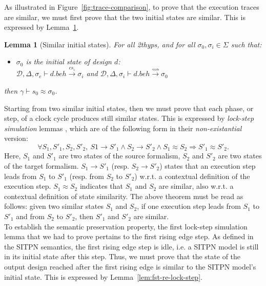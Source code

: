 \documentclass[pdflatex,sn-mathphys]{sn-jnl}%
\theoremstyle{thmstyleone}%
\theoremstyle{thmstyletwo}%
\theoremstyle{thmstylethree}%
\newtheorem{lemma}{Lemma}%
\begin{document}
As illustrated in Figure~\ref{fig:trace-comparison}, to prove that the
execution traces are similar, we must first prove that the two initial
states are similar. This is expressed by
Lemma~\ref{lem:sim-init-states}.
\begin{lemma}[Similar initial states]
  \label{lem:sim-init-states}
  For all \hm2thyps{}, and for all $\sigma_0,\sigma_i\in{}\Sigma$ such that:
  \begin{itemize}
  \item $\sigma_0$ is the initial state of design $d$:\\
    $\mathcal{D},\Delta,\sigma_e\vdash{}d.beh\xrightarrow{cs_i}{}\sigma_i$ and
    $\mathcal{D},\Delta,\sigma_i\vdash{}d.beh\xrightarrow{\rightsquigarrow}{}\sigma_0$
  \end{itemize}
  then $\gamma\vdash{}s_0\approx\sigma_0$.
\end{lemma}

Starting from two similar initial states, then we must prove that each
phase, or step, of a clock cycle produces still similar states.  This
is expressed by \textit{lock-step simulation} lemmas \cite{Leroy2009},
which are of the following form in their \textit{non-existantial}
version:
\begin{equation*}
  \forall{}S_1,S'_1,S_2,S'_2,~S1\rightarrow{}S'_1\land{}S_2\rightarrow{}S'_2\land{}S_1\approx{}S_2\Rightarrow{}S'_1\approx{}S'_2.
\end{equation*}
Here, $S_1$ and $S'_1$ are two states of the source formalism, $S_2$
and $S'_2$ are two states of the target formalism.
$S_1\rightarrow{}S'_1$ (resp. $S_2\rightarrow{}S'_2$) states that an
execution step leads from $S_1$ to $S'_1$ (resp. from $S_2$ to $S'_2$)
w.r.t. a contextual definition of the execution
step. $S_1\approx{}S_2$ indicates that $S_1$ and $S_2$ are similar,
also w.r.t. a contextual definition of state similarity. The above
theorem must be read as follows: given two similar states $S_1$ and
$S_2$, if one execution step leads from $S_1$ to $S'_1$ and from $S_2$
to $S'_2$, then $S'_1$ and $S'_2$ are similar. \\

To establish the semantic preservation property, the first lock-step
simulation lemma that we had to prove pertains to the first rising
edge step. As defined in the SITPN semantics, the first rising edge
step is idle, i.e. a SITPN model is still in its initial state after
this step. Thus, we must prove that the state of the output design
reached after the first rising edge is similar to the SITPN model's
initial state. This is expressed by Lemma~\ref{lem:fst-re-lock-step}.
\end{document}
